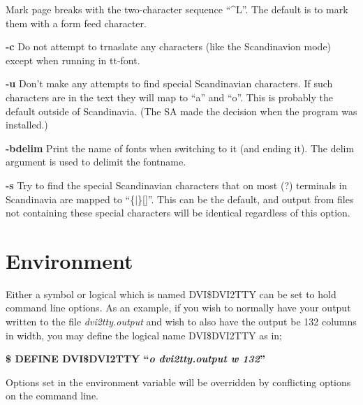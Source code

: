 \begin{list}{}{\setlength{\leftmargin}{0.6in}}
Mark page breaks with the two-character sequence ``\^{}L''. The default is
to mark them with a form feed character.
\item[{{\bf -c}}]
Do not attempt to trnaslate any characters (like the Scandinavion mode)
except when running in tt-font.
\item[{{\bf -u}}]
Don't make any attempts to find special Scandinavian characters.
If such characters are in the text they will map to ``a'' and ``o''.
This is probably the default outside of Scandinavia. (The SA made
the decision when  the program was installed.)
\item[{{\bf -bdelim}}]
Print the name of fonts when switching to it (and ending it). The delim
argument is used to delimit the fontname.
\item[{{\bf -s}}]
Try to find the special Scandinavian characters that on most (?)
terminals in Scandinavia are mapped to ``\{$|$\}[\bs ]''.
This can be the default, and output from files not containing these
special characters will be identical regardless of this option.
\end{list}
%
%
\section*{Environment}
%
%
%
%
Either a symbol or logical which is named DVI\$DVI2TTY can be set to hold
command line options.  As an example,  if you wish to normally have your
output written to the file {\it dvi2tty.output}\/ and wish to also have
the output be 132 columns in width,  you may define the logical name
DVI\$DVI2TTY as in;
\par\vspace{1.0\baselineskip}
\begin{center}
{\bf \$ DEFINE DVI\$DVI2TTY ``{\it o dvi2tty.output w 132}''}
\end{center}
\par\vspace{1.0\baselineskip}
Options set in the environment variable will be overridden by conflicting
options on the command line.
